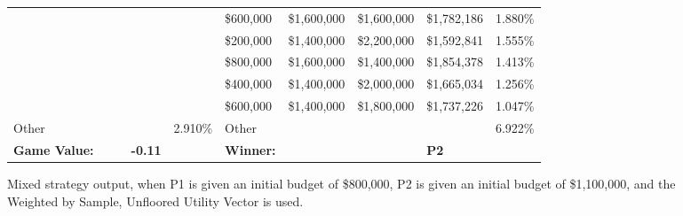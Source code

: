 \documentclass[11pt]{article}
\begin{document}
\begin{figure}
\begin{tabular}{ |p{1.0cm}p{1.0cm}p{1.0cm}p{2.0cm}|p{1.0cm}||p{1.0cm}p{1.0cm}p{1.0cm}p{2.0cm}|p{1.0cm}|}
&&&& & \$600,000 & \$1,600,000 & \$1,600,000 & \$1,782,186 & 1.880\% \\
&&&& & \$200,000 & \$1,400,000 & \$2,200,000 & \$1,592,841 & 1.555\% \\
&&&& & \$800,000 & \$1,600,000 & \$1,400,000 & \$1,854,378 & 1.413\% \\
&&&& & \$400,000 & \$1,400,000 & \$2,000,000 & \$1,665,034 & 1.256\% \\
&&&& & \$600,000 & \$1,400,000 & \$1,800,000 & \$1,737,226 & 1.047\% \\
\hline
Other &&&& 2.910\% & Other &&&& 6.922\% \\
\hline
\small \textbf{Game Value:} &&& \small \textbf{-0.11} && \small \textbf{Winner:} &&& \small \textbf{P2}&\\
\hline
\end{tabular}
\caption{Mixed strategy output, when P1 is given an initial budget of \$800,000, P2 is given an initial budget of \$1,100,000, and the Weighted by Sample, Unfloored Utility Vector is used.}
\label{8v11table.6}
\end{figure}
\end{document}

